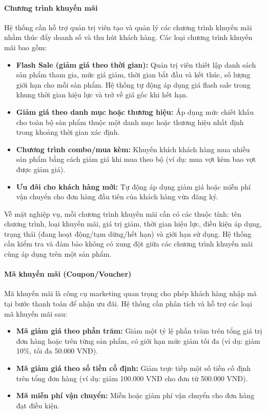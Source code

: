 \documentclass[13pt]{article}
\begin{document}
\paragraph{Chương trình khuyến mãi}
Hệ thống cần hỗ trợ quản trị viên tạo và quản lý các chương trình khuyến mãi nhằm thúc đẩy doanh số và thu hút khách hàng. Các loại chương trình khuyến mãi bao gồm:

\begin{itemize}
    \item \textbf{Flash Sale (giảm giá theo thời gian):} Quản trị viên thiết lập danh sách sản phẩm tham gia, mức giá giảm, thời gian bắt đầu và kết thúc, số lượng giới hạn cho mỗi sản phẩm. Hệ thống tự động áp dụng giá flash sale trong khung thời gian hiệu lực và trở về giá gốc khi hết hạn.
    \item \textbf{Giảm giá theo danh mục hoặc thương hiệu:} Áp dụng mức chiết khấu cho toàn bộ sản phẩm thuộc một danh mục hoặc thương hiệu nhất định trong khoảng thời gian xác định.
    \item \textbf{Chương trình combo/mua kèm:} Khuyến khích khách hàng mua nhiều sản phẩm bằng cách giảm giá khi mua theo bộ (ví dụ: mua vợt kèm bao vợt được giảm giá).
    \item \textbf{Ưu đãi cho khách hàng mới:} Tự động áp dụng giảm giá hoặc miễn phí vận chuyển cho đơn hàng đầu tiên của khách hàng vừa đăng ký.
\end{itemize}

Về mặt nghiệp vụ, mỗi chương trình khuyến mãi cần có các thuộc tính: tên chương trình, loại khuyến mãi, giá trị giảm, thời gian hiệu lực, điều kiện áp dụng, trạng thái (đang hoạt động/tạm dừng/hết hạn) và giới hạn sử dụng. Hệ thống cần kiểm tra và đảm bảo không có xung đột giữa các chương trình khuyến mãi cùng áp dụng trên một sản phẩm.

\paragraph{Mã khuyến mãi (Coupon/Voucher)}
Mã khuyến mãi là công cụ marketing quan trọng cho phép khách hàng nhập mã tại bước thanh toán để nhận ưu đãi. Hệ thống cần phân tích và hỗ trợ các loại mã khuyến mãi sau:

\begin{itemize}
    \item \textbf{Mã giảm giá theo phần trăm:} Giảm một tỷ lệ phần trăm trên tổng giá trị đơn hàng hoặc trên từng sản phẩm, có giới hạn mức giảm tối đa (ví dụ: giảm 10\%, tối đa 50.000 VNĐ).
    \item \textbf{Mã giảm giá theo số tiền cố định:} Giảm trực tiếp một số tiền cố định trên tổng đơn hàng (ví dụ: giảm 100.000 VNĐ cho đơn từ 500.000 VNĐ).
    \item \textbf{Mã miễn phí vận chuyển:} Miễn hoặc giảm phí vận chuyển cho đơn hàng đạt điều kiện.
\end{itemize}
\end{document}
